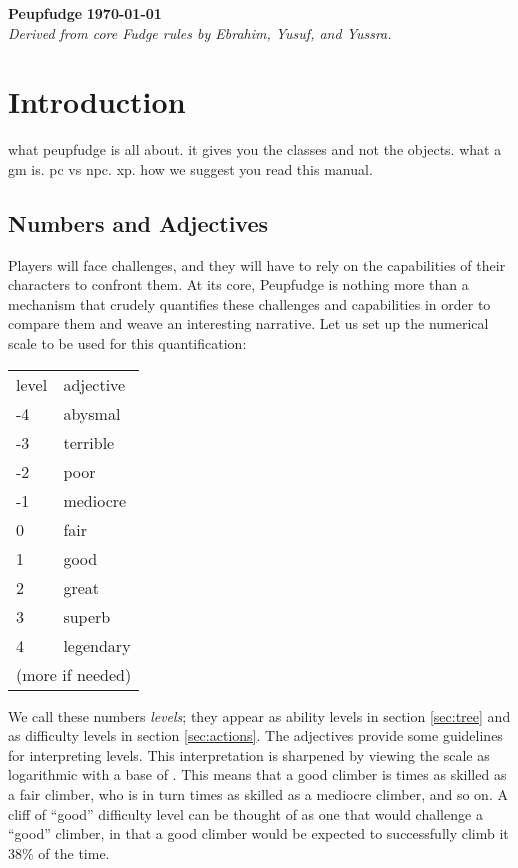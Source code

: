 \documentclass[12pt]{article}
\title{\peupfudge}
\author{Ebrahim \\ Yusuf \\ Yussra}
\date{\today}
\newcommand{\notes}[1]{{\color{Tan} #1}}
\newcommand{\peupfudge}{Peupfudge}
\begin{document}
\textbf{\peupfudge}
\hfill
\textbf{\today}\\
\textit{Derived from core Fudge rules by Ebrahim, Yusuf, and Yussra.}

\section{Introduction}
\notes{what peupfudge is all about.
it gives you the classes and not the objects.
what a gm is.
pc vs npc.
xp.
how we suggest you read this manual.}

\subsection{Numbers and Adjectives} \label{sec:quant}

Players will face challenges, and they will have to rely on the capabilities of their
characters to confront them.
At its core, \peupfudge{} is nothing more than a mechanism 
that crudely quantifies these challenges and capabilities in order to
compare them and weave an interesting narrative.
Let us set up the numerical scale to be used for this quantification:
\begin{center}
{\setlength{\extrarowheight}{1pt}
\begin{tabular}{l|l}
level & adjective \\
\cline{1-2}
-4 & abysmal \\
-3 & terrible \\
-2 & poor \\
-1 & mediocre \\
0  & fair \\
1  & good \\
2  & great \\
3  & superb \\
4  & legendary \\[8pt]
\multicolumn{2}{c}{(more if needed)}
\end{tabular}}
\end{center}
We call these numbers \emph{levels}; they appear as ability levels in section \ref{sec:tree}
and as difficulty levels in section \ref{sec:actions}.
The adjectives provide some guidelines for interpreting levels.
This interpretation is sharpened by viewing the scale as
logarithmic with a base of \unskip.
This means that a good climber is  times as skilled as a fair climber,
who is in turn  times as skilled as a mediocre climber, and so on.
A cliff of ``good'' difficulty level can be thought of as one that would challenge a ``good'' climber,
in that a good climber would be expected to successfully climb it $38\%$ of the time.
\end{document}
